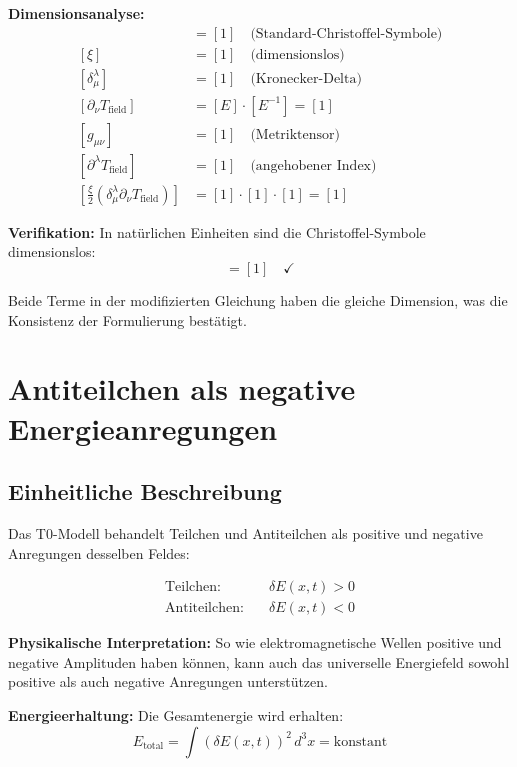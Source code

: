 \documentclass[12pt,a4paper]{report}
\begin{document}
\textbf{Dimensionsanalyse:}
\begin{align}
	[\Gamma^\lambda_{\mu\nu|0}] &= [1] \quad \text{(Standard-Christoffel-Symbole)} \\
	[\xi] &= [1] \quad \text{(dimensionslos)} \\
	[\delta^\lambda_\mu] &= [1] \quad \text{(Kronecker-Delta)} \\
	[\partial_\nu T_{\text{field}}] &= [E] \cdot [E^{-1}] = [1] \\
	[g_{\mu\nu}] &= [1] \quad \text{(Metriktensor)} \\
	[\partial^\lambda T_{\text{field}}] &= [1] \quad \text{(angehobener Index)} \\
	\left[\frac{\xi}{2} \left(\delta^\lambda_\mu \partial_\nu T_{\text{field}}\right)\right] &= [1] \cdot [1] \cdot [1] = [1]
\end{align}

\textbf{Verifikation:} In natürlichen Einheiten sind die Christoffel-Symbole dimensionslos:
\begin{equation}
	[\Gamma^\lambda_{\mu\nu}] = [1] \quad \checkmark
\end{equation}

Beide Terme in der modifizierten Gleichung haben die gleiche Dimension, was die Konsistenz der Formulierung bestätigt.
	\section{Antiteilchen als negative Energieanregungen}
	\label{sec:antiparticles_negative_energy}
	
\subsection{Einheitliche Beschreibung}
\label{subsec:unified_description}

Das T0-Modell behandelt Teilchen und Antiteilchen als positive und negative Anregungen desselben Feldes:

\begin{align}
	\text{Teilchen:} \quad &\delta E(x,t) > 0 \\
	\text{Antiteilchen:} \quad &\delta E(x,t) < 0
\end{align}

\textbf{Physikalische Interpretation:} So wie elektromagnetische Wellen positive und negative Amplituden haben können, kann auch das universelle Energiefeld sowohl positive als auch negative Anregungen unterstützen.

\textbf{Energieerhaltung:} Die Gesamtenergie wird erhalten:
\begin{equation}
	E_{\text{total}} = \int (\delta E(x,t))^2 \, d^3x = \text{konstant}
\end{equation}
\end{document}
